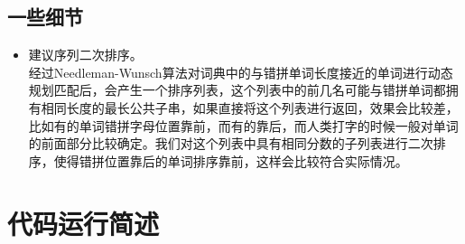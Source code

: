 \documentclass[UTF8,a4paper]{ctexart}
\begin{document}
\subsection{一些细节}

\begin{itemize}
\item 建议序列二次排序。\\
经过Needleman-Wunsch算法对词典中的与错拼单词长度接近的单词进行动态规划匹配后，会产生一个排序列表，这个列表中的前几名可能与错拼单词都拥有相同长度的最长公共子串，如果直接将这个列表进行返回，效果会比较差，比如有的单词错拼字母位置靠前，而有的靠后，而人类打字的时候一般对单词的前面部分比较确定。我们对这个列表中具有相同分数的子列表进行二次排序，使得错拼位置靠后的单词排序靠前，这样会比较符合实际情况。
\end{itemize}

\section{代码运行简述}
\end{document}
